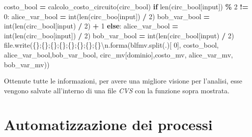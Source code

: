 \documentclass[
  italian,
]{book}
\newenvironment{Shaded}{\begin{snugshade}}{\end{snugshade}}
\newcommand{\BuiltInTok}[1]{#1}
\newcommand{\CharTok}[1]{\textcolor[rgb]{0.31,0.60,0.02}{#1}}
\newcommand{\ControlFlowTok}[1]{\textcolor[rgb]{0.13,0.29,0.53}{\textbf{#1}}}
\newcommand{\DecValTok}[1]{\textcolor[rgb]{0.00,0.00,0.81}{#1}}
\newcommand{\NormalTok}[1]{#1}
\newcommand{\OperatorTok}[1]{\textcolor[rgb]{0.81,0.36,0.00}{\textbf{#1}}}
\newcommand{\SpecialCharTok}[1]{\textcolor[rgb]{0.00,0.00,0.00}{#1}}
\newcommand{\StringTok}[1]{\textcolor[rgb]{0.31,0.60,0.02}{#1}}
\begin{document}
\begin{Shaded}
\begin{Highlighting}[]
\NormalTok{      costo\_bool }\OperatorTok{=}\NormalTok{ calcolo\_costo\_circuito(circ\_bool)}
      \ControlFlowTok{if} \BuiltInTok{len}\NormalTok{(circ\_bool[}\StringTok{\textquotesingle{}input\textquotesingle{}}\NormalTok{]) }\OperatorTok{\%} \DecValTok{2} \OperatorTok{!=} \DecValTok{0}\NormalTok{:}
\NormalTok{          alice\_var\_bool }\OperatorTok{=} \BuiltInTok{int}\NormalTok{(}\BuiltInTok{len}\NormalTok{(circ\_boo[}\StringTok{\textquotesingle{}input\textquotesingle{}}\NormalTok{]) }\OperatorTok{/} \DecValTok{2}\NormalTok{)}
\NormalTok{          bob\_var\_bool }\OperatorTok{=} \BuiltInTok{int}\NormalTok{(}\BuiltInTok{len}\NormalTok{(circ\_bool[}\StringTok{\textquotesingle{}input\textquotesingle{}}\NormalTok{) }\OperatorTok{/} \DecValTok{2}\NormalTok{) }\OperatorTok{+} \DecValTok{1}
      \ControlFlowTok{else}\NormalTok{:}
\NormalTok{          alice\_var\_bool }\OperatorTok{=} \BuiltInTok{int}\NormalTok{(}\BuiltInTok{len}\NormalTok{(circ\_boo[}\StringTok{\textquotesingle{}input\textquotesingle{}}\NormalTok{]) }\OperatorTok{/} \DecValTok{2}\NormalTok{)}
\NormalTok{          bob\_var\_bool }\OperatorTok{=} \BuiltInTok{int}\NormalTok{(}\BuiltInTok{len}\NormalTok{(circ\_bool[}\StringTok{\textquotesingle{}input\textquotesingle{}}\NormalTok{) }\OperatorTok{/} \DecValTok{2}\NormalTok{)}
      \BuiltInTok{file}\NormalTok{.write(}\StringTok{\textquotesingle{}}\SpecialCharTok{\{\}}\StringTok{;}\SpecialCharTok{\{\}}\StringTok{;}\SpecialCharTok{\{\}}\StringTok{;}\SpecialCharTok{\{\}}\StringTok{;}\SpecialCharTok{\{\}}\StringTok{;}\SpecialCharTok{\{\}}\StringTok{;}\SpecialCharTok{\{\}}\StringTok{;}\SpecialCharTok{\{\}}\CharTok{\textbackslash{}n}\StringTok{\textquotesingle{}}\NormalTok{.forma(blfmv.split(}\StringTok{\textquotesingle{}.\textquotesingle{}}\NormalTok{)[}
          \DecValTok{0}\NormalTok{], costo\_bool, alice\_var\_bool,bob\_var\_bool, circ\_mv[}\StringTok{\textquotesingle{}dominio\textquotesingle{}}\NormalTok{],costo\_mv, alice\_var\_mv, bob\_var\_mv))}
\end{Highlighting}
\end{Shaded}

Ottenute tutte le informazioni, per avere una migliore visione per l'analisi, esse vengono salvate all'interno di una file \emph{CVS} con la funzione sopra mostrata.

\newpage

\hypertarget{automatizzazione-dei-processi}{%
\section{Automatizzazione dei processi}\label{automatizzazione-dei-processi}}
\end{document}
